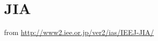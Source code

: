 \documentclass[english]{ieej-e-samcon}
\begin{document}
\section{JIA}
\begin{comment}
  \begin{thebibliography}{99}
    \bibitem{texbook}
    D.E. Knuth, The \TeX{}book, Addison-Wesley (1994)
    
    \bibitem{Seroul}
    R. Seroul \& S. Levy: 
    A Beginner's Book of \TeX, Springer-Verlag (1989)
    
    \bibitem{Salomon}
    D. Salomon: 
    The Advanced \TeX{}book, 
    Springer-Verlag (1995)
    
    \bibitem{Eijkhout}
    V. Eijkhout: \TeX\ by Topic, Addison-Wesley (1991)
    
    \bibitem{PA}
    P.W. Abrahams: \TeX\ for the Impatient, Addison-Wesley (1992)
    
    \bibitem{Bech}
    S. von Bechtolsheim: \TeX\ in Practice, Springer-Verlag (1993)
    
    
    \bibitem{Gr}
    G. Gr\"{a}tzer: Math into \TeX--A Simple Introduction to \AmSLaTeX,
    Birkh\"{a}user (1993)
    
    \bibitem{Walsh}
    N. Walsh: Making \TeX\ Work, O'Reilly \& Associates (1994)%
    
    \bibitem{latexbook}
    L. Lamport, \LaTeX: A Document Preparation System, Second Edition,  
    Addison-Wesley (1994) 
    
    \bibitem{FMi1}
    M. Goossens, F. Mittelbach \& A. Samarin: 
    The \LaTeX\ Companion, Addison-Wesley (1994)
    
    \bibitem{FMi2}
    M. Goossens, S. Rahts, and F. Mittelbach: 
    The \LaTeX\ Graphics Companion, Addison-Wesley (1997)
    
    
  \end{thebibliography}
\end{comment}
from \url{http://www2.iee.or.jp/ver2/ias/IEEJ-JIA/}
\end{document}
